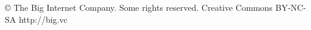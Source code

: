 \usepackage{cclicenses}

\beamertemplatenavigationsymbolsempty

{%
\begin{beamercolorbox}{}
  \hspace{8pt} \copyright \hspace{0in} The Big Internet Company. Some rights reserved. \cc \hspace{-0.1in} Creative Commons BY-NC-SA \hfill http://big.vc
  \vspace{8pt}
\end{beamercolorbox}%
}
